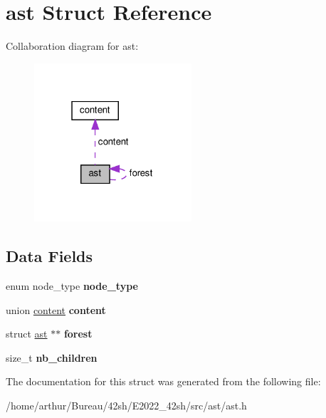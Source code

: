 \hypertarget{structast}{}\section{ast Struct Reference}
\label{structast}


Collaboration diagram for ast\+:
\nopagebreak
\begin{figure}[H]
\begin{center}
\leavevmode
\includegraphics[width=166pt]{structast__coll__graph}
\end{center}
\end{figure}
\subsection*{Data Fields}
\begin{DoxyCompactItemize}
\item 
\mbox{\label{structast_a3dae8bc7c708705be3a6e1688378868e}} 
enum node\+\_\+type {\bfseries node\+\_\+type}
\item 
\mbox{\label{structast_aefaa9c821d95b7348abce18c88be6f38}} 
union \hyperlink{unioncontent}{content} {\bfseries content}
\item 
\mbox{\label{structast_af40b987ca960506b1c29e377c0ab634c}} 
struct \hyperlink{structast}{ast} $\ast$$\ast$ {\bfseries forest}
\item 
\mbox{\label{structast_a450ec876d01db67cf3bb207d8e281c0c}} 
size\+\_\+t {\bfseries nb\+\_\+children}
\end{DoxyCompactItemize}


The documentation for this struct was generated from the following file\+:\begin{DoxyCompactItemize}
\item 
/home/arthur/\+Bureau/42sh/\+E2022\+\_\+42sh/src/ast/ast.\+h\end{DoxyCompactItemize}
